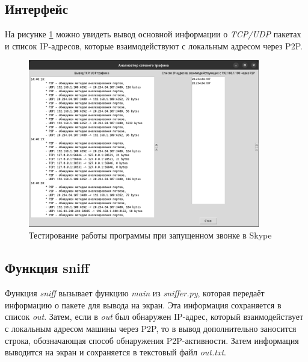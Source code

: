 \documentclass[bachelor, och, coursework]{SCWorks}
\begin{document}
\subsection{Интерфейс}
На рисунке \ref{ris:test} можно увидеть вывод основной информации о \textit{TCP/UDP} пакетах и 
список IP-адресов, которые взаимодействуют с локальным адресом через P2P.
\begin{figure}[H]
    \centering
    \includegraphics[width=0.9\textwidth]{test2.png}
    \caption{Тестирование работы программы при запущенном звонке в Skype}
    \label{ris:test}
\end{figure}

\subsection{Функция sniff}
Функция \textit{sniff} вызывает функцию \textit{main} из \textit{sniffer.py}, которая передаёт информацию о пакете для вывода на экран. Эта информация сохраняется в список \textit{out}. Затем, если в \textit{out} был обнаружен IP-адрес, который взаимодействует с локальным адресом машины через P2P, то в вывод дополнительно заносится строка, обозначающая способ обнаружения P2P-активности. Затем информация выводится на экран и сохраняется в текстовый файл \textit{out.txt}.
\end{document}

